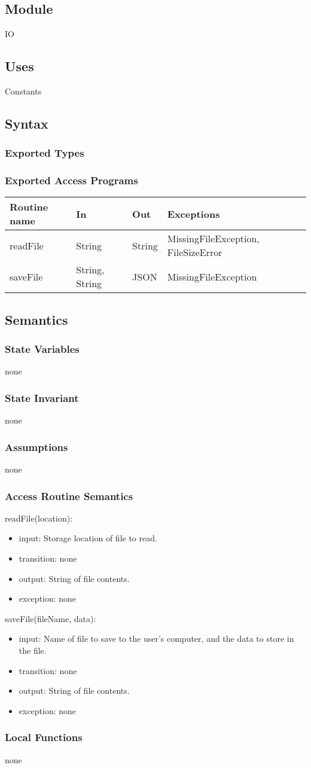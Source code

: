 \documentclass[12pt, titlepage]{article}
\newcommand{\newModule}[9]{
	\subsection* {Module}
		#1
	\subsection* {Uses}
		#2
	\subsection* {Syntax}
		\subsubsection* {Exported Types}
			#3
		\subsubsection* {Exported Access Programs}
			#4
	\subsection* {Semantics}
		\subsubsection* {State Variables}
			#5
		\subsubsection* {State Invariant}
			#6
		\subsubsection* {Assumptions}
			#7
		\subsubsection* {Access Routine Semantics}
			#8
		\subsubsection* {Local Functions}
			#9
}
\newcommand{\newAccessProgram}[5]{
	\noindent #1:
		\begin{itemize}
		    \item input: #2
			\item transition: #3
			\item output: #4
			\item exception: #5
		\end{itemize}
}
\newcommand{\row}[4]{#1 & #2 & #3 & #4 ~\\ \hline}
\newcommand{\accessProgramsTableStart}{
\begin{tabular}{| l | l | l | l |}
\hline
\textbf{Routine name} & \textbf{In} & \textbf{Out} & \textbf{Exceptions}\\
\hline
}
\newcommand{\accessProgramsTableEnd}{
	\end{tabular}
}
\begin{document}
\newModule{IO}
	{%
		Constants
	}
	{%
		
	}
	{%
		\accessProgramsTableStart
			\row{readFile}{String}{String}{MissingFileException, FileSizeError}
			\row{saveFile}{String, String}{JSON}{MissingFileException}
		\accessProgramsTableEnd
	}
	{%
		none \\

		 
	}
	{%
        none
	}
	{%
		none
	}
	{%
		\newAccessProgram{readFile(location)}
			{%
				Storage location of file to read.
			}
			{%
				none
			}
			{%
				String of file contents.
			}
			{%
				none
			}
		\newAccessProgram{saveFile(fileName, data)}
			{%
				Name of file to save to the user's computer, and the data to store in the file.
			}
			{%
				none
			}
			{%
				String of file contents.
			}
			{%
				none
			}
	}
	{%
		none
	}
	
\newpage
\end{document}
